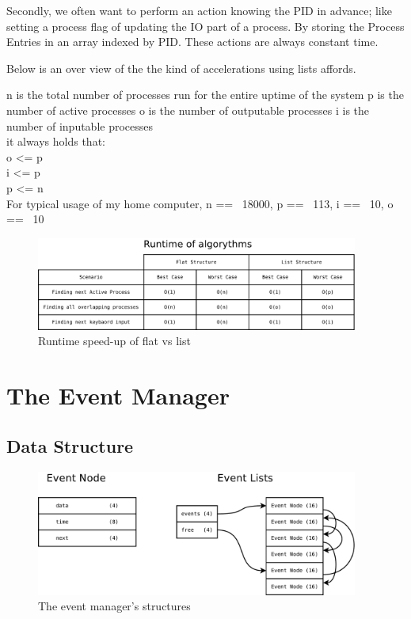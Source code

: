 \documentclass[a4paper]{report}
\begin{document}
Secondly, we often want to perform an action knowing the PID in advance; like setting a process flag of updating the IO part of a process. By storing the Process Entries in an array indexed by PID. These actions are always constant time.

Below is an over view of the the kind of accelerations using lists affords.

n is the total number of processes run for the entire uptime of the system
p is the number of active processes
o is the number of outputable processes
i is the number of inputable processes\\
it always holds that:\\
o \textless= p\\
i \textless= p\\
p \textless= n\\

For typical usage of my home computer, n == ~18000, p == ~113, i == ~10, o == ~10


\begin{figure}[ht]
\centering
\includegraphics[width=400px]{images/List_Speedup}
\caption{Runtime speed-up of flat vs list}
\label{fig:WinTitleBarScreen}
\end{figure}



\clearpage
\section{The Event Manager}

\subsection{Data Structure}


\begin{figure}[ht]
\centering
\includegraphics[width=400px]{images/Events_Structure}
\caption{The event manager's structures}
\label{fig:WinTitleBarScreen}
\end{figure}
\end{document}
